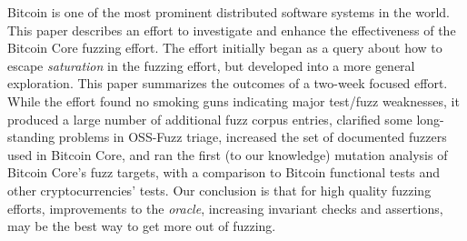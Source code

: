 Bitcoin is one of the most prominent distributed software systems in the world.  This paper describes an effort to investigate and enhance the effectiveness of the Bitcoin Core fuzzing effort.  The effort initially began as a query about how to escape \emph{saturation} in the fuzzing effort, but developed into a more general exploration.  This paper summarizes the outcomes of a two-week focused effort.  While the effort found no smoking guns indicating major test/fuzz weaknesses, it produced a large number of additional fuzz corpus entries, clarified some long-standing problems in OSS-Fuzz triage, increased the set of documented fuzzers used in Bitcoin Core, and ran the first (to our knowledge) mutation analysis of Bitcoin Core's fuzz targets, with a comparison to Bitcoin functional tests and other cryptocurrencies' tests. Our conclusion is that for high quality fuzzing efforts, improvements to the \emph{oracle}, increasing invariant checks and assertions, may be the best way to get more out of fuzzing.
